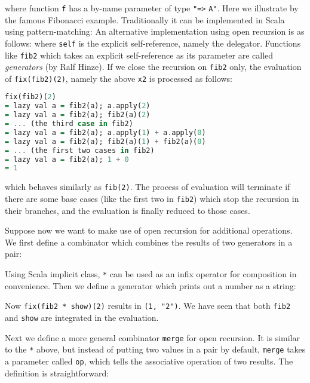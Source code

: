 where function \lstinline{f} has a by-name parameter of type \lstinline{"=>} \lstinline{A"}.
Here we illustrate by the famous Fibonacci example. Traditionally it can be implemented in Scala using pattern-matching:
An alternative implementation using open recursion is as follows:
where \lstinline{self} is the explicit self-reference, namely the delegator. Functions like \lstinline{fib2} which takes
an explicit self-reference as its parameter are called \textit{generators} (by Ralf Hinze).
If we close the recursion on \lstinline{fib2} only, the evaluation of \lstinline{fix(fib2)(2)}, namely the above \lstinline{x2} is processed as follows:
\begin{lstlisting}[language=Haskell,keywords={}]
   fix(fib2)(2)
= lazy val a = fib2(a); a.apply(2)
= lazy val a = fib2(a); fib2(a)(2)
= ... (the third case in fib2)
= lazy val a = fib2(a); a.apply(1) + a.apply(0)
= lazy val a = fib2(a); fib2(a)(1) + fib2(a)(0)
= ... (the first two cases in fib2)
= lazy val a = fib2(a); 1 + 0
= 1
\end{lstlisting}
which behaves similarly as \lstinline{fib(2)}. The process of evaluation will terminate if there are some base cases (like the first two in
\lstinline{fib2}) which stop the recursion in their branches, and the evaluation is finally reduced to those cases.

Suppose now we want to make use of open recursion for additional operations. We first define a combinator which combines the results of two generators in a pair:

Using Scala implicit class, \lstinline{*} can be used as an infix operator for composition in convenience.
Then we define a generator which prints out a number as a string:

Now \lstinline{fix(fib2 * show)(2)} results in \lstinline{(1, "2")}. We have seen that both \lstinline{fib2} and \lstinline{show} are integrated in the evaluation.

Next we define a more general combinator \lstinline{merge} for open recursion. It is similar to the \lstinline{*} above, but instead of putting two values in a pair by default, \lstinline{merge} takes a parameter called \lstinline{op}, which tells the associative operation of two results. The definition is straightforward:

